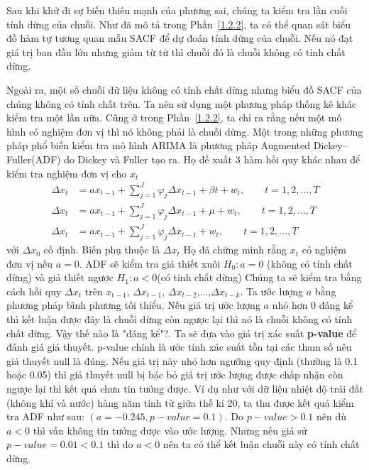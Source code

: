 

Sau khi khử đi sự biến thiên mạnh của phương sai, chúng ta kiểm tra lần cuối tính dừng của chuỗi. Như đã mô tả trong Phần~\ref{1.2.2}, ta có thể quan sát biểu đồ hàm tự tương quan mẫu SACF để dự đoán tính dừng của chuỗi. Nếu nó đạt giá trị ban đầu lớn nhưng giảm từ từ thì chuỗi đó là chuỗi không có tính chất dừng. 

Ngoài ra, một số chuỗi dữ liệu không có tính chất dừng nhưng biểu đồ SACF của chúng không có tính chất trên. Ta nên sử dụng một phương pháp thống kê khác kiểm tra một lần nữa. Cũng ở trong Phần~\ref{1.2.2}, ta chỉ ra rằng nếu một mô hình có nghiệm đơn vị thì nó không phải là chuỗi dừng. Một trong những phương pháp phổ biến kiểm tra mô hình ARIMA là phương pháp Augmented Dickey–Fuller(ADF) \citep{df79} do Dickey và Fuller tạo ra. Họ đề xuất 3 hàm hồi quy khác nhau để kiểm tra nghiệm đơn vị cho $x_t$
\begin{align}
\Delta{x_t} &= ax_{t-1} + \sum\limits^{J}_{j=1}\varphi_{j}\Delta{x_{t-1}}+ \beta{t} + w_t, \qquad t = 1,2,...,T \\
\Delta{x_t} &= ax_{t-1} + \sum\limits^{J}_{j=1}\varphi_{j}\Delta{x_{t-1}}+ \mu + w_t , \qquad t = 1,2,...,T\\
\Delta{x_t} &= ax_{t-1} + \sum\limits^{J}_{j=1}\varphi_{j}\Delta{x_{t-1}} + w_t, \qquad t = 1,2,...,T
\end{align}
với $\Delta{x_0}$ cố định. Biến phụ thuộc là $\Delta{x_t}$ Họ đã chứng minh rằng $x_t$ có nghiệm đơn vị nếu $a=0$. ADF sẽ kiểm tra giả thiết xuôi $H_0: a = 0$ (không có tính chất dừng) và giả thiết ngược $H_1: a < 0$(có tính chất dừng)
Chúng ta sẽ kiểm tra bằng cách hồi quy $\Delta{x_t}$ trên $x_{t-1}$, $\Delta{x_{t-1}}$, $\Delta{x_{t-2}}$,...,$\Delta{x_{t-k}}$. Ta ước lượng $a$ bằng phương pháp bình phương tối thiểu. Nếu giá trị ước lượng $a$ nhỏ hơn $0$ đáng kể thì kết luận được đây là chuỗi dừng còn ngược lại thì nó là chuỗi không có tính chất dừng. Vậy thế nào là "đáng kể"?. Ta sẽ dựa vào giá trị xác suất \textbf{p-value} để đánh giá giả thuyết. p-value chính là ước tính xác suất tồn tại các tham số nêu giả thuyết null là đúng. Nếu giá trị này nhỏ hơn ngưỡng quy định (thường là 0.1 hoặc 0.05) thì giả thuyết null bị bác bỏ giá trị ước lượng được chấp nhận còn ngược lại thì kết quả chưa tin tưởng được. Ví dụ như với dữ liệu nhiệt độ trái đất (không khí và nước) hàng năm tính từ giữa thế kỉ 20, ta thu được kết quả kiểm tra ADF như sau: $(a= -0.245 , p-value = 0.1)$. Do $p-value > 0.1$ nên dù $a<0$ thì vẫn không tin tưởng được vào ước lượng. Nhưng nếu giả sử $p-value = 0.01 < 0.1$ thì do $a<0$ nên ta có thể kết luận chuỗi này có tính chất dừng.

